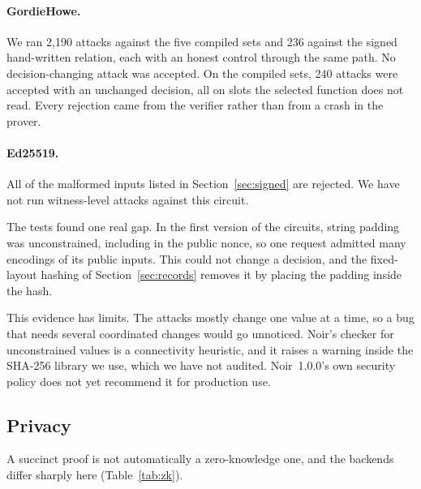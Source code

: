 \documentclass[11pt]{article}
\begin{document}
\paragraph{GordieHowe.} We ran 2,190 attacks against the five compiled sets and 236 against the signed hand-written relation, each with an honest control through the same path. No decision-changing attack was accepted. On the compiled sets, 240 attacks were accepted with an unchanged decision, all on slots the selected function does not read. Every rejection came from the verifier rather than from a crash in the prover.

\paragraph{Ed25519.} All of the malformed inputs listed in Section~\ref{sec:signed} are rejected. We have not run witness-level attacks against this circuit.

The tests found one real gap. In the first version of the circuits, string padding was unconstrained, including in the public nonce, so one request admitted many encodings of its public inputs. This could not change a decision, and the fixed-layout hashing of Section~\ref{sec:records} removes it by placing the padding inside the hash.

This evidence has limits. The attacks mostly change one value at a time, so a bug that needs several coordinated changes would go unnoticed. Noir's checker for unconstrained values is a connectivity heuristic, and it raises a warning inside the SHA-256 library we use, which we have not audited. Noir~1.0.0's own security policy does not yet recommend it for production use.

\subsection{Privacy}
\label{sec:privacy}

A succinct proof is not automatically a zero-knowledge one, and the backends differ sharply here (Table~\ref{tab:zk}).
\end{document}

